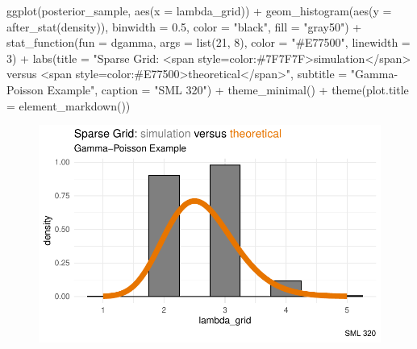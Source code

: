 \documentclass[
  letterpaper,
  DIV=11,
  numbers=noendperiod]{scrartcl}
\newenvironment{Shaded}{\begin{snugshade}}{\end{snugshade}}
\newcommand{\AttributeTok}[1]{\textcolor[rgb]{0.40,0.45,0.13}{#1}}
\newcommand{\DecValTok}[1]{\textcolor[rgb]{0.68,0.00,0.00}{#1}}
\newcommand{\FloatTok}[1]{\textcolor[rgb]{0.68,0.00,0.00}{#1}}
\newcommand{\FunctionTok}[1]{\textcolor[rgb]{0.28,0.35,0.67}{#1}}
\newcommand{\NormalTok}[1]{\textcolor[rgb]{0.00,0.23,0.31}{#1}}
\newcommand{\SpecialCharTok}[1]{\textcolor[rgb]{0.37,0.37,0.37}{#1}}
\newcommand{\StringTok}[1]{\textcolor[rgb]{0.13,0.47,0.30}{#1}}
\begin{document}
\begin{Shaded}
\begin{Highlighting}[]
\FunctionTok{ggplot}\NormalTok{(posterior\_sample, }\FunctionTok{aes}\NormalTok{(}\AttributeTok{x =}\NormalTok{ lambda\_grid)) }\SpecialCharTok{+} 
  \FunctionTok{geom\_histogram}\NormalTok{(}\FunctionTok{aes}\NormalTok{(}\AttributeTok{y =} \FunctionTok{after\_stat}\NormalTok{(density)), }
                 \AttributeTok{binwidth =} \FloatTok{0.5}\NormalTok{,}
                 \AttributeTok{color =} \StringTok{"black"}\NormalTok{,}
                 \AttributeTok{fill =} \StringTok{"gray50"}\NormalTok{) }\SpecialCharTok{+} 
  \FunctionTok{stat\_function}\NormalTok{(}\AttributeTok{fun =}\NormalTok{ dgamma, }\AttributeTok{args =} \FunctionTok{list}\NormalTok{(}\DecValTok{21}\NormalTok{, }\DecValTok{8}\NormalTok{),}
                \AttributeTok{color =} \StringTok{"\#E77500"}\NormalTok{, }\AttributeTok{linewidth =} \DecValTok{3}\NormalTok{) }\SpecialCharTok{+} 
  \FunctionTok{labs}\NormalTok{(}\AttributeTok{title =} \StringTok{"Sparse Grid: \textless{}span style=\textquotesingle{}color:\#7F7F7F\textquotesingle{}\textgreater{}simulation\textless{}/span\textgreater{} versus \textless{}span style=\textquotesingle{}color:\#E77500\textquotesingle{}\textgreater{}theoretical\textless{}/span\textgreater{}"}\NormalTok{,}
         \AttributeTok{subtitle =} \StringTok{"Gamma{-}Poisson Example"}\NormalTok{,}
         \AttributeTok{caption =} \StringTok{"SML 320"}\NormalTok{) }\SpecialCharTok{+}
  \FunctionTok{theme\_minimal}\NormalTok{() }\SpecialCharTok{+}
  \FunctionTok{theme}\NormalTok{(}\AttributeTok{plot.title =} \FunctionTok{element\_markdown}\NormalTok{())}
\end{Highlighting}
\end{Shaded}

\begin{figure}[H]

{\centering \includegraphics{ps4_code_files/figure-pdf/unnamed-chunk-16-1.pdf}

}

\end{figure}
\end{document}
